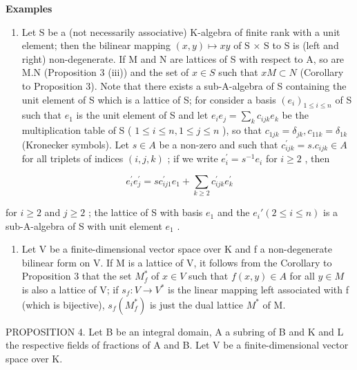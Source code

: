 \textbf{Examples}\par

\begin{enumerate}
\def\labelenumi{(\arabic{enumi})}
\setcounter{enumi}{3}
\tightlist
\item
  Let S be a (not necessarily associative) K-algebra of finite rank with a unit element; then the bilinear mapping \((x,y)\mapsto xy\) of S × S to S is (left and right) non-degenerate. If M and N are lattices of S with respect to A, so are M.N (Proposition 3 (iii)) and the set of \(x\in S\) such that \(xM\subset N\) (Corollary to Proposition 3). Note that there exists a sub-A-algebra of S containing the unit element of S which is a lattice of S; for consider a basis \((e_{i})_{1\leqslant i\leqslant n}\) of S such that \(e_{1}\) is the unit element of S and let \(e_{i}e_{j}=\sum_{k}c_{ijk}e_{k}\) be the multiplication table of S ( \(1\leqslant i\leqslant n,1\leqslant j\leqslant n\) ), so that \(c_{1jk}=\delta_{jk},c_{11k}=\delta_{1k}\) (Kronecker symbols). Let \(s\in A\) be a non-zero and such that \(c_{ijk}^{\prime}=s.c_{ijk}\in A\) for all triplets of indices \((i,j,k)\) ; if we write \(e_{i}^{\prime}=s^{-1}e_{i}\) for \(i\geqslant2\) , then
\end{enumerate}

\[
e _ {i} ^ {\prime} e _ {j} ^ {\prime} = s c _ {i j 1} ^ {\prime} e _ {1} + \sum_ {k \geqslant 2} c _ {i j k} ^ {\prime} e _ {k} ^ {\prime}
\]

for \(i \geqslant 2\) and \(j \geqslant 2\) ; the lattice of S with basis \(e_1\) and the \(e_i' (2 \leqslant i \leqslant n)\) is a sub-A-algebra of S with unit element \(e_1\) .

\begin{enumerate}
\def\labelenumi{(\arabic{enumi})}
\setcounter{enumi}{4}
\tightlist
\item
  Let V be a finite-dimensional vector space over K and f a non-degenerate bilinear form on V. If M is a lattice of V, it follows from the Corollary to Proposition 3 that the set \(M_{f}^{*}\) of \(x \in V\) such that \(f(x, y) \in A\) for all \(y \in M\) is also a lattice of V; if \(s_{f}: V \to V^{*}\) is the linear mapping left associated with f (which is bijective), \(s_{f}(M_{f}^{*})\) is just the dual lattice \(M^{*}\) of M.
\end{enumerate}

PROPOSITION 4. Let B be an integral domain, A a subring of B and K and L the respective fields of fractions of A and B. Let V be a finite-dimensional vector space over K.

